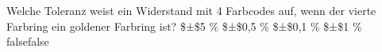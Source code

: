     {Welche Toleranz weist ein Widerstand mit 4 Farbcodes auf, wenn der vierte Farbring ein goldener Farbring ist?}
    { \$±\$5 \%}
    { \$±\$0,5 \%}
    { \$±\$0,1 \%}
    { \$±\$1 \%}
    {false}{false}
